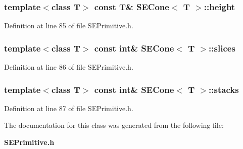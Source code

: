 \subsubsection[{height}]{\setlength{\rightskip}{0pt plus 5cm}template$<$class T$>$ const T\& {\bf S\+E\+Cone}$<$ T $>$\+::height}\label{class_s_e_cone_a496e02354c29ecdc993b59e7d299cc37}


Definition at line 85 of file S\+E\+Primitive.\+h.

\subsubsection[{slices}]{\setlength{\rightskip}{0pt plus 5cm}template$<$class T$>$ const int\& {\bf S\+E\+Cone}$<$ T $>$\+::slices}\label{class_s_e_cone_af328d1f4244868c8950b945152db9ab8}


Definition at line 86 of file S\+E\+Primitive.\+h.

\subsubsection[{stacks}]{\setlength{\rightskip}{0pt plus 5cm}template$<$class T$>$ const int\& {\bf S\+E\+Cone}$<$ T $>$\+::stacks}\label{class_s_e_cone_aa558b39dce639f2ff47ff0db46caf158}


Definition at line 87 of file S\+E\+Primitive.\+h.



The documentation for this class was generated from the following file\+:\begin{DoxyCompactItemize}
\item 
{\bf S\+E\+Primitive.\+h}\end{DoxyCompactItemize}
